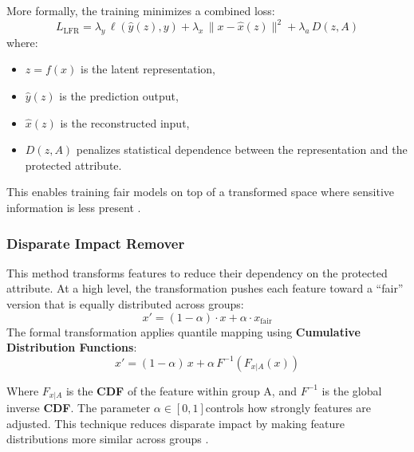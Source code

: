 \documentclass[12pt,a4paper,openright,twoside]{book}
\begin{document}
More formally, the training minimizes a combined loss:
\begin{equation}
    {L}_{\text{LFR}} = \lambda_y\, \ell(\hat{y}(z), y) + \lambda_x\, \lVert x - \hat{x}(z) \rVert^2 + \lambda_a\, D(z, A)
\end{equation}
where:
\begin{itemize}
    \item \begin{math}z = f(x)\end{math} is the latent representation,
    \item \begin{math}\hat{y}(z)\end{math} is the prediction output,
    \item \begin{math}\hat{x}(z)\end{math} is the reconstructed input,
    \item \begin{math}D(z, A)\end{math} penalizes statistical dependence between the representation and the protected attribute.
\end{itemize}
This enables training fair models on top of a transformed space where sensitive information is less present \cite{pmlr-v28-zemel13}.


\subsubsection{Disparate Impact Remover} This method transforms features to reduce their dependency on the protected attribute.
At a high level, the transformation pushes each feature toward a “fair” version that is equally distributed across groups:
\begin{equation}
    x' = (1 - \alpha) \cdot x + \alpha \cdot x_{\text{fair}}
\end{equation}
The formal transformation applies quantile mapping using \textbf{Cumulative Distribution Functions}:
\begin{equation}
    x' = (1 - \alpha)\, x + \alpha\, F^{-1}(F_{x|A}(x))
\end{equation}

Where \begin{math} F_{x | A} \end{math} is the \textbf{CDF} of the feature within group A, and \begin{math}F^{-1}\end{math} is the global inverse \textbf{CDF}. The parameter \begin{math} \alpha \in [0, 1] \end{math}controls how strongly features are adjusted.
This technique reduces disparate impact by making feature distributions more similar across groups \cite{feldman2015certifyingremovingdisparateimpact}.
\end{document}
